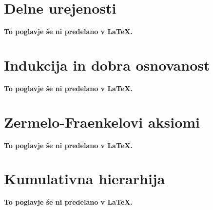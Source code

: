 \documentclass[11pt,a4paper]{book}
\begin{document}
\chapter{Delne urejenosti}
\textbf{To poglavje še ni predelano v {\LaTeX}.}
%

\chapter{Indukcija in dobra osnovanost}
\textbf{To poglavje še ni predelano v {\LaTeX}.}
%



\chapter{Zermelo-Fraenkelovi aksiomi}
\textbf{To poglavje še ni predelano v {\LaTeX}.}
%

\chapter{Kumulativna hierarhija}
\textbf{To poglavje še ni predelano v {\LaTeX}.}
%


% 



%
%
%
\end{document}
